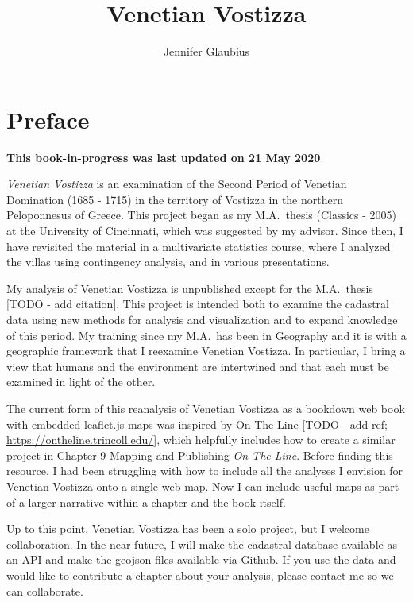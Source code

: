 \documentclass[english,]{book}
\title{Venetian Vostizza}
\author{Jennifer Glaubius}
\date{}
\begin{document}
\maketitle

{
\setcounter{tocdepth}{1}
\tableofcontents
}
\hypertarget{preface}{%
\chapter*{Preface}\label{preface}}

\textbf{This book-in-progress was last updated on 21 May 2020}

\emph{Venetian Vostizza} is an examination of the Second Period of Venetian Domination
(1685 - 1715) in the territory of Vostizza in the northern Peloponnesus of Greece. This project began as my M.A.~thesis (Classics - 2005) at the University of Cincinnati, which was suggested by my advisor. Since then, I have revisited the material in a multivariate statistics course, where I analyzed the villas using contingency analysis, and in various presentations.

My analysis of Venetian Vostizza is unpublished except for the M.A.~thesis {[}TODO - add citation{]}. This project is intended both to examine the cadastral data using new methods for analysis and visualization and to expand knowledge of this period. My training since my M.A.~has been in Geography and it is with a geographic framework that I reexamine Venetian Vostizza. In particular, I bring a view that humans and the environment are intertwined and that each must be examined in light of the other.

The current form of this reanalysis of Venetian Vostizza as a bookdown web book with embedded leaflet.js maps was inspired by On The Line {[}TODO - add ref; \url{https://ontheline.trincoll.edu/}{]}, which helpfully includes how to create a similar project in Chapter 9 Mapping and Publishing \emph{On The Line}. Before finding this resource, I had been struggling with how to include all the analyses I envision for Venetian Vostizza onto a single web map. Now I can include useful maps as part of a larger narrative within a chapter and the book itself.

Up to this point, Venetian Vostizza has been a solo project, but I welcome collaboration. In the near future, I will make the cadastral database available as an API and make the geojson files available via Github. If you use the data and would like to contribute a chapter about your analysis, please contact me so we can collaborate.
\end{document}
